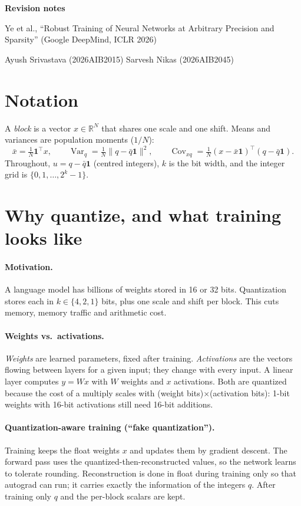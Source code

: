\documentclass[11pt]{article}
\newcommand{\R}{\mathbb{R}}
\newcommand{\one}{\mathbf 1}
\newcommand{\Var}{\operatorname{Var}}
\newcommand{\Cov}{\operatorname{Cov}}
\begin{document}
\begin{center}
{\LARGE\bfseries Revision notes}\par\vspace{4pt}
{\large Ye et al., ``Robust Training of Neural Networks at Arbitrary Precision and Sparsity'' (Google DeepMind, ICLR 2026)}\par\vspace{4pt}
Ayush Srivastava (2026AIB2015) \quad Sarvesh Nikas (2026AIB2045)
\end{center}

\tableofcontents

\section{Notation}

A \emph{block} is a vector $x\in\R^N$ that shares one scale and one shift. Means and variances are population moments ($1/N$):
\[
\bar x=\tfrac1N\one^\top x,\qquad
\Var_q=\tfrac1N\|q-\bar q\one\|^2,\qquad
\Cov_{xq}=\tfrac1N(x-\bar x\one)^\top(q-\bar q\one).
\]
Throughout, $u=q-\bar q\one$ (centred integers), $k$ is the bit width, and the integer grid is $\{0,1,\dots,2^k-1\}$.

\section{Why quantize, and what training looks like}

\paragraph{Motivation.} A language model has billions of weights stored in 16 or 32 bits. Quantization stores each in $k\in\{4,2,1\}$ bits, plus one scale and shift per block. This cuts memory, memory traffic and arithmetic cost.

\paragraph{Weights vs.\ activations.} \emph{Weights} are learned parameters, fixed after training. \emph{Activations} are the vectors flowing between layers for a given input; they change with every input. A linear layer computes $y=Wx$ with $W$ weights and $x$ activations. Both are quantized because the cost of a multiply scales with (weight bits)$\times$(activation bits): 1-bit weights with 16-bit activations still need 16-bit additions.

\paragraph{Quantization-aware training (``fake quantization'').} Training keeps the float weights $x$ and updates them by gradient descent. The forward pass uses the quantized-then-reconstructed values, so the network learns to tolerate rounding. Reconstruction is done in float during training only so that autograd can run; it carries exactly the information of the integers $q$. After training only $q$ and the per-block scalars are kept.
\end{document}
